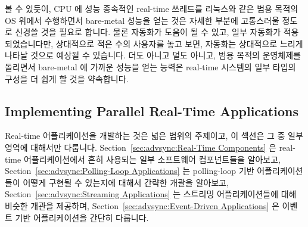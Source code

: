 볼 수 있듯이, CPU 에 성능 종속적인 real-time 쓰레드를 리눅스와 같은 범용 목적의
OS 위에서 수행하면서 bare-metal 성능을 얻는 것은 자세한 부분에 고통스러울
정도로 신경쓸 것을 필요로 합니다.
물론 자동화가 도움이 될 수 있고, 일부 자동화가 적용되었습니다만, 상대적으로
적은 수의 사용자를 놓고 보면, 자동화는 상대적으로 느리게 나타날 것으로 예상될
수 있습니다.
더도 아니고 덜도 아니고, 범용 목적의 운영체제를 돌리면서 bare-metal 에 가까운
성능을 얻는 능력은 real-time 시스템의 일부 타입의 구성을 더 쉽게 할 것을
약속합니다.

\subsection{Implementing Parallel Real-Time Applications}
\label{sec:advsync:Implementing Parallel Real-Time Applications}

Real-time 어플리케이션을 개발하는 것은 넓은 범위의 주제이고, 이 섹션은 그 중
일부 영역에 대해서만 다룹니다.
Section~\ref{sec:advsync:Real-Time Components}
은 real-time 어플리케이션에서 흔히 사용되는 일부 소프트웨어 컴포넌트들을
알아보고,
Section~\ref{sec:advsync:Polling-Loop Applications}
는 polling-loop 기반 어플리케이션들이 어떻게 구현될 수 있는지에 대해서 간략한
개괄을 알아보고,
Section~\ref{sec:advsync:Streaming Applications}
는 스트리밍 어플리케이션들에 대해 비슷한 개관을 제공하며,
Section~\ref{sec:advsync:Event-Driven Applications}
은 이벤트 기반 어플리케이션을 간단히 다룹니다.
\iffalse

